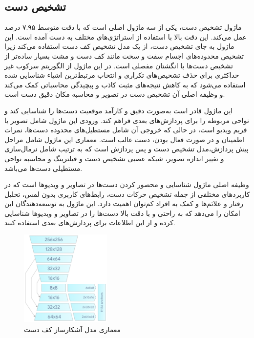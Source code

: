


\subsection[تشخیص دست]{تشخیص دست\protect{}}
ماژول تشخیص دست، یکی از سه ماژول اصلی است که با دقت متوسط ۷.۹۵ درصد عمل می‌کند. این دقت بالا با استفاده از استراتژی‌های مختلف به دست آمده است. این ماژول به جای تشخیص دست، 
از یک مدل تشخیص کف دست استفاده می‌کند زیرا تشخیص محدوده‌های اجسام سفت و سخت مانند کف دست و مشت بسیار ساده‌تر از تشخیص دست‌ها با انگشتان مفصلی است. در این ماژول از
 الگوریتم سرکوب غیر حداکثری برای حذف تشخیص‌های تکراری و انتخاب مرتبط‌ترین اشیاء شناسایی شده استفاده می‌شود که به کاهش نتیجه‌های مثبت کاذب و پیچیدگی محاسباتی کمک می‌کند و وظیفه اصلی آن تشخیص دست در تصویر و محاسبه مکان دقیق دست است.

این ماژول قادر است به‌صورت دقیق و کارآمد موقعیت دست‌ها را شناسایی کند و نواحی مربوطه را برای
 پردازش‌های بعدی فراهم کند. ورودی این ماژول شامل تصویر یا فریم ویدیو است، در حالی که خروجی آن شامل مستطیل‌های محدوده دست‌ها، نمرات اطمینان و در صورت فعال بودن، دست غالب است. معماری این ماژول شامل 
 مراحل پیش پردازش،مدل تشخیص دست و پس پردازش است که به ترتیب شامل نرمال‌سازی و تغییر اندازه تصویر، شبکه عصبی تشخیص دست و فیلترینگ و محاسبه نواحی مستطیلی دست‌ها می‌باشد.

وظیفه اصلی ماژول شناسایی و محصور کردن دست‌ها در تصاویر و ویدیوها است که در کاربردهای مختلفی از جمله تشخیص حرکات دست، رابط‌های کاربری بدون لمس، تحلیل رفتار و علائم‌ها و کمک به افراد کم‌توان
 اهمیت دارد. این ماژول به توسعه‌دهندگان این امکان را می‌دهد که به راحتی و با دقت بالا دست‌ها را در تصاویر و ویدیوها شناسایی کرده و از این اطلاعات برای پردازش‌های بعدی استفاده کنند.


\begin{figure}[h]
    \centering
    \includegraphics[width=0.4\textwidth]{hand_detector.png}
    \caption[معماری مدل آشکارساز کف دست]{معماری مدل آشکارساز کف دست\cite{zhang2020mediapipe}}
\end{figure}


